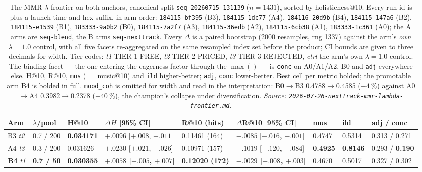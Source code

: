 \documentclass[11pt]{article}
\newcommand{\runid}[1]{\texttt{\small\seqsplit{#1}}}
\newcommand{\dsid}[1]{\texttt{\small #1}}
\newcommand{\best}[1]{\textbf{#1}}
\begin{document}
\begin{table}[ht]
  \centering
  \caption{The MMR $\lambda$ frontier on both anchors, canonical split
  \dsid{seq-20260715-131139} ($n=\num{1431}$), sorted by holisticness@10. Every
  run id is \protect\runid{run-20260726-} plus a launch time and hex suffix, in
  arm order: \texttt{184115-bf395} (B3), \texttt{184115-1dc77} (A4),
  \texttt{184116-20d9b} (B4), \texttt{184115-147a6} (B2),
  \texttt{184115-e1539} (B1), \texttt{183333-9a0b2} (B0),
  \texttt{184115-7a2f7} (A3), \texttt{184115-36edb} (A2),
  \texttt{184115-6cb38} (A1), \texttt{183333-1c361} (A0); the A arms are
  \texttt{seq-blend}, the B arms \texttt{seq-nexttrack}. Every $\Delta$ is a
  paired bootstrap (\num{2000} resamples, rng \num{1337}) against the arm's
  \emph{own} $\lambda=\num{1.0}$ control, with all five facets re-aggregated on
  the same resampled index set before the product; CI bounds are given to three
  decimals for width. Tier codes: \emph{t1} TIER-1 FREE, \emph{t2} TIER-2 PRICED,
  \emph{t3} TIER-3 REJECTED, \emph{ctrl} the arm's own $\lambda=\num{1.0}$
  control. The binding facet --- the one entering the eagerness factor through the
  $\max()$ --- is \texttt{conc} on A0/A1/A2, B0 and \texttt{adj} everywhere else.
  H@10, R@10, \texttt{mus} ($=$ music@10) and \texttt{ild}
  higher-better; \texttt{adj}, \texttt{conc} lower-better. Best cell per metric
  bolded; the promotable arm B4 is bolded in full. \texttt{mood\_coh} is omitted
  for width and read in the interpretation: B0$\to$B3 \num{0.4788}$\to$\num{0.4585}
  ($-\SI{4}{\percent}$) against A0$\to$A4 \num{0.3982}$\to$\num{0.2378}
  ($-\SI{40}{\percent}$), the champion's collapse under diversification.
  \emph{Source: \texttt{2026-07-26-nexttrack-mmr-lambda-frontier.md}.}}
  \label{tab:mmr-arms}
  {\scriptsize\setlength{\tabcolsep}{1.9pt}\begin{tabular}{lllllllll}
    \toprule
    Arm & $\lambda$/pool & H@10 & $\Delta H$ [95\% CI] & R@10 (hits) & $\Delta$R@10 [95\% CI] & mus & ild & adj / conc \\
    \midrule
    B3 \emph{t2} & 0.7 / 200 & \best{0.034171} & $+.0096$ [$+.008$, $+.011$] & 0.11461 (164) & $-.0085$ [$-.016$, $-.001$] & 0.4747 & 0.5314 & 0.313 / 0.271 \\
    A4 \emph{t3} & 0.3 / 200 & 0.031626 & $+.0230$ [$+.021$, $+.026$] & 0.10971 (157) & $-.1019$ [$-.120$, $-.084$] & \best{0.4925} & \best{0.8146} & 0.293 / \best{0.190} \\
    \best{B4} \emph{t1} & \best{0.7 / 50} & \best{0.030355} & \best{$+.0058$ [$+.005$, $+.007$]} & \best{0.12020 (172)} & \best{$-.0029$ [$-.008$, $+.003$]} & 0.4670 & 0.5017 & 0.327 / 0.302 \\

\end{tabular}}
\end{table}
\end{document}
